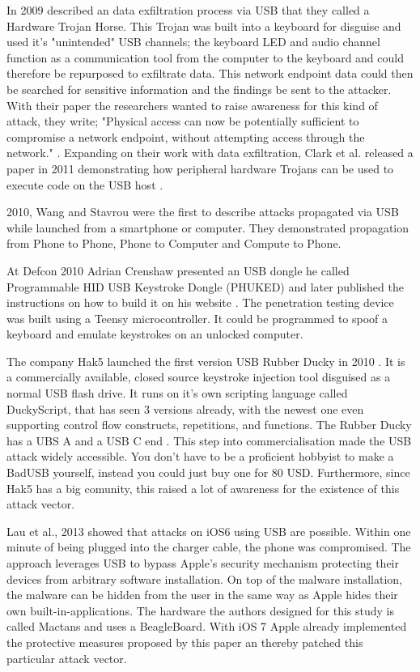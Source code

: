 In 2009 \cite{clarkHardwareTrojanHorse2009} described an data exfiltration process via USB that they called a Hardware Trojan Horse. This Trojan was built into a keyboard for disguise and used it's "unintended" USB channels; the keyboard LED and audio channel function as a communication tool from the computer to the keyboard and could therefore be repurposed to exfiltrate data. This network endpoint data could then be searched for sensitive information and the findings be sent to the attacker. With their paper the researchers wanted to raise awareness for this kind of attack, they write; "Physical access can now be potentially sufficient to compromise a network endpoint, without attempting access through the network." \cite[p.~7]{clarkHardwareTrojanHorse2009}.
Expanding on their work with data exfiltration, Clark et al.\cite{clarkRisksAssociatedUSB2011} released a paper in 2011 demonstrating how peripheral hardware Trojans can be used to execute code on the USB host \cite{clarkRisksAssociatedUSB2011}. 

2010, Wang and Stavrou \cite{wangExploitingSmartphoneUSB2010} were the first to describe attacks propagated via USB while launched from a smartphone or computer. They demonstrated propagation from Phone to Phone, Phone to Computer and Compute to Phone.

At Defcon 2010 Adrian Crenshaw presented an USB dongle he called Programmable HID USB Keystroke Dongle (PHUKED) and later published the instructions on how to build it on his website \cite{ProgrammableHIDUSB}. The penetration testing device was built using a Teensy microcontroller. It could be programmed to spoof a keyboard and emulate keystrokes on an unlocked computer. 

The company Hak5 launched the first version USB Rubber Ducky in 2010 \cite{USBRubberDucky}. It is a commercially available, closed source keystroke injection tool disguised as a normal USB flash drive. It runs on it's own scripting language called DuckyScript, that has seen 3 versions already, with the newest one even supporting control flow constructs, repetitions, and functions. The Rubber Ducky has a UBS A and a USB C end \cite{USBRubberDucky2023}. This step into commercialisation made the USB attack widely accessible. You don't have to be a proficient hobbyist to make a BadUSB yourself, instead you could just buy one for 80 USD\cite{USBRubberDucky2023}. Furthermore, since Hak5 has a big comunity, this raised a lot of awareness for the existence of this attack vector. 

Lau et al., 2013 \cite{lauMactansInjectingMalware2013} showed that attacks on iOS6 using USB are possible. Within one minute of being plugged into the charger cable, the phone was compromised. The approach leverages USB to bypass Apple's security mechanism protecting their devices from arbitrary software installation. On top of the malware installation, the malware can be hidden from the user in the same way as Apple hides their own built-in-applications. The hardware the authors designed for this study is called Mactans and uses a BeagleBoard.
With iOS 7 Apple already implemented the protective measures proposed by this paper an thereby patched this particular attack vector. 

